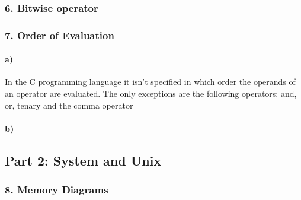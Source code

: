 \documentclass[12pt]{article}
\begin{document}
\subsubsection*{6. Bitwise operator}

\subsubsection*{7. Order of Evaluation}
\paragraph{a)}
In the C programming language it isn't specified in which order the operands of an operator are evaluated. The only exceptions are the following operators: and, or, tenary and the comma operator

\paragraph{b)} 

\subsection*{Part 2: System and Unix}
\subsubsection*{8. Memory Diagrams}
\end{document}
